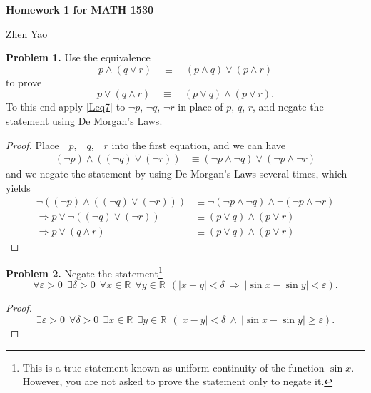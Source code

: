 \documentclass[12pt,leqno]{amsart}
\begin{document}
\centerline{\bf Homework 1 for MATH 1530}
\centerline{Zhen Yao}

\bigskip

\medskip

\noindent
{\bf Problem 1.}
Use the equivalence
\begin{equation}
\label{Leq7}
p\wedge (q\vee r) \quad \equiv \quad (p\wedge q)\vee (p\wedge r)
\end{equation}
to prove
$$
p\vee (q\wedge r) \quad \equiv \quad (p\vee q)\wedge (p\vee r).
$$
To this end apply \eqref{Leq7} to $\neg p$, $\neg q$, $\neg r$ in
place of $p$, $q$, $r$, and negate the statement using De Morgan's Laws.
\begin{proof}
Place $\neg p$, $\neg q$, $\neg r$ into the first equation, and we can have
\begin{align*}
    (\neg p) \wedge \left( (\neg q) \vee (\neg r) \right) & \equiv (\neg p \wedge \neg q) \vee (\neg p \wedge \neg r)
\end{align*}
and we negate the statement by using De Morgan's Laws several times, which yields
\begin{align*}
    \neg \left( (\neg p) \wedge \left( (\neg q) \vee (\neg r) \right) \right) & \equiv \neg (\neg p \wedge \neg q) \wedge \neg (\neg p \wedge \neg r) \\
    \Rightarrow p \vee \neg \left( (\neg q) \vee (\neg r) \right) & \equiv (p \vee q) \wedge (p \vee r) \\
    \Rightarrow p \vee (q \wedge r) & \equiv (p \vee q) \wedge (p \vee r)
\end{align*}
\end{proof}


\medskip

\noindent
{\bf Problem 2.}
Negate the statement\footnote{This is a true statement known as uniform continuity of the function
$\sin x$. However, you are not asked to prove the statement only to negate it.}
$$
    \forall \varepsilon>0\ \ \exists \delta>0 \ \ \forall x\in\mathbb{R}\ \ \forall y\in\mathbb{R}
    \ \
    (|x-y|<\delta \ \Rightarrow \ |\sin x - \sin y|<\varepsilon).
$$
\begin{proof}
$$
    \exists \varepsilon>0\ \ \forall \delta>0 \ \ \exists x\in\mathbb{R}\ \ \exists y\in\mathbb{R}\ \
    (|x-y|<\delta \ \wedge \ |\sin x - \sin y| \geq \varepsilon).
    $$
\end{proof}


\medskip
\end{document}
